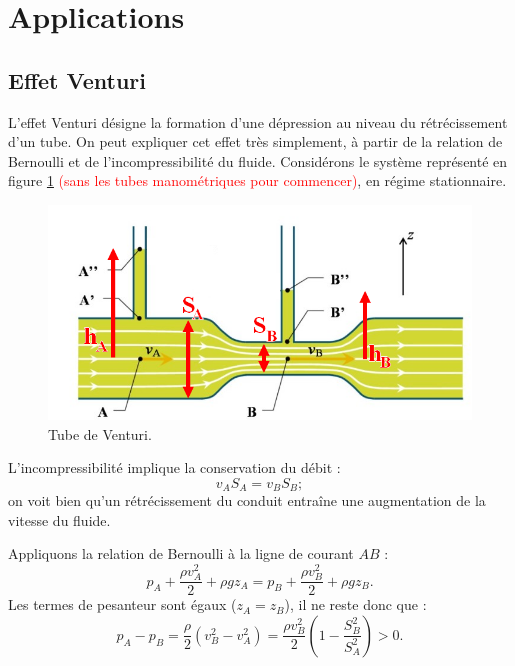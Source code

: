 \documentclass[11pt,a4paper]{report}
\begin{document}
\section{Applications}

\subsection{Effet Venturi}

L'effet Venturi désigne la formation d'une dépression au niveau du rétrécissement d'un tube. On peut expliquer cet effet très simplement, à partir de la relation de Bernoulli et de l'incompressibilité du fluide. Considérons le système représenté en figure \ref{fig:venturi} \textcolor{red}{(sans les tubes manométriques pour commencer)}, en régime stationnaire.
\begin{figure}[h!]
\begin{center}
	\includegraphics[scale = 0.3]{venturi.png}
	\caption{Tube de Venturi.} 
	\label{fig:venturi}
\end{center}
\end{figure}

L'incompressibilité implique la conservation du débit :
\begin{equation}
	v_A S_A = v_B S_B;
\end{equation}
on voit bien qu'un rétrécissement du conduit entraîne une augmentation de la vitesse du fluide. 

Appliquons la relation de Bernoulli à la ligne de courant $AB$ :
\begin{equation}
	p_A + \frac{\rho v_A^2}{2} + \rho g z_A = p_B + \frac{\rho v_B^2}{2} + \rho g z_B. 
\end{equation}
Les termes de pesanteur sont égaux ($z_A = z_B$), il ne reste donc que :
\begin{equation}
	p_A - p_B = \frac{\rho}{2}\left(v_B^2 - v_A^2\right) = \frac{\rho v_B^2}{2}\left(1 - \frac{S_B^2}{S_A^2}\right) > 0.
\end{equation}
\end{document}
